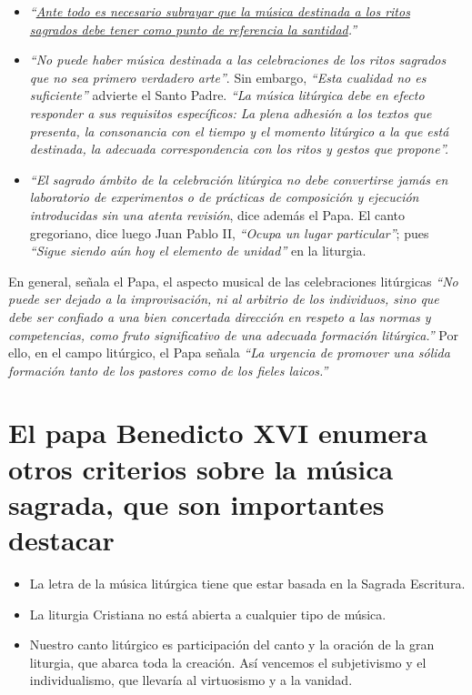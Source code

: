 \documentclass[letterpaper, 12pt]{book}
\begin{document}
    \begin{itemize}
        \item \textit{``\underline{Ante todo es necesario subrayar que la m\'usica destinada a los ritos}\\ \underline{sagrados debe tener como punto de referencia la santidad}.''}
        \item \textit{``No puede haber m\'usica destinada a las celebraciones de los ritos sagrados que no sea primero verdadero arte''}. Sin embargo, \textit{``Esta cualidad no es suficiente''} advierte el Santo Padre. \textit{``La m\'usica lit\'urgica debe en efecto responder a sus requisitos espec\'ificos: La plena adhesión a los textos que presenta, la consonancia con el tiempo y el momento lit\'urgico a la que est\'a destinada, la adecuada correspondencia con los ritos y gestos que propone''.}
        \item \textit{``El sagrado \'ambito de la celebraci\'on lit\'urgica no debe convertirse jam\'as en laboratorio de experimentos o de pr\'acticas de composici\'on y ejecuci\'on introducidas sin una atenta revisi\'on}, dice adem\'as el Papa. El canto gregoriano, dice luego Juan Pablo II, \textit{``Ocupa un lugar particular''}; pues \textit{``Sigue siendo a\'un hoy el elemento de unidad''} en la liturgia.
    \end{itemize}

    En general, se\~nala el Papa, el aspecto musical de las celebraciones lit\'urgicas \textit{``No puede ser dejado a la improvisaci\'on, ni al arbitrio de los individuos, sino que debe ser confiado a una bien concertada direcci\'on en respeto a las normas y competencias, como fruto significativo de una adecuada formaci\'on lit\'urgica.''} Por ello, en el campo lit\'urgico, el Papa se\~nala \textit{``La urgencia de promover una s\'olida formaci\'on tanto de los pastores como de los fieles laicos.''}
    
    \section{El papa Benedicto XVI enumera otros criterios sobre la m\'usica sagrada, que son importantes destacar}
    
    \begin{itemize}
        \item La letra de la m\'usica lit\'urgica tiene que estar basada en la Sagrada Escritura.
        \item La liturgia Cristiana no est\'a abierta a cualquier tipo de m\'usica.
        \item Nuestro canto lit\'urgico es participaci\'on del canto y la oraci\'on de la gran liturgia, que abarca toda la creaci\'on. As\'i vencemos el subjetivismo y el individualismo, que llevaría al virtuosismo y a la vanidad.
    \end{itemize}
    
\end{document}
